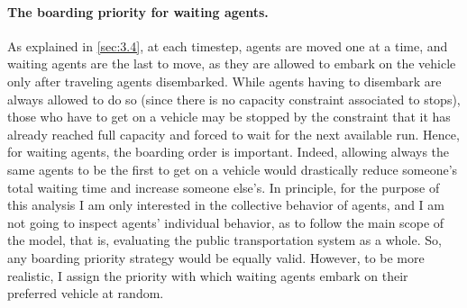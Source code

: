 \paragraph{The boarding priority for waiting agents.}
As explained in \ref{sec:3.4}, at each timestep, agents are moved one at a time, and waiting agents are the last to move, as they are allowed to embark on the vehicle only after traveling agents disembarked. While agents having to disembark are always allowed to do so (since there is no capacity constraint associated to stops), those who have to get on a vehicle may be stopped by the constraint that it has already reached full capacity and forced to wait for the next available run. Hence, for waiting agents, the boarding order is important. Indeed, allowing always the same agents to be the first to get on a vehicle would drastically reduce someone's total waiting time and increase someone else's.
In principle, for the purpose of this analysis I am only interested in the collective behavior of agents, and I am not going to inspect agents' individual behavior, as to follow the main scope of the model, that is, evaluating the public transportation system as a whole. So, any boarding priority strategy would be equally valid. However, to be more realistic, I assign the priority with which waiting agents embark on their preferred vehicle at random. 
